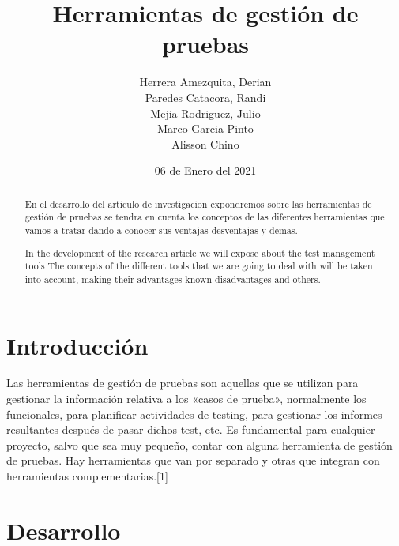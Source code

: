 \documentclass[twocolumn]{article}
\newenvironment{poliabstract}[1]
   {\renewcommand{\abstractname}{#1}\begin{abstract}}
   {\end{abstract}}
\begin{document}
\title{Herramientas de gestión de pruebas}
\author{Herrera Amezquita,
Derian  \\Paredes Catacora, Randi \\Mejia Rodriguez, Julio\\Marco Garcia Pinto\\Alisson Chino}


\date{06 de Enero del 2021}

\maketitle

\begin{poliabstract}{Resumen} 
  En el desarrollo del articulo de investigacion expondremos sobre las herramientas de gestión de pruebas 
  se tendra en cuenta los conceptos de las diferentes herramientas que vamos a tratar dando a conocer sus ventajas
   desventajas y demas.
  
\end{poliabstract}

\begin{poliabstract}{Abstract} 
  In the development of the research article we will expose about the test management tools
  The concepts of the different tools that we are going to deal with will be taken into account, 
  making their advantages known
  disadvantages and others.
\end{poliabstract}

\section{Introducción}
Las herramientas de gestión de pruebas son aquellas que se utilizan para gestionar la 
información relativa a los «casos de prueba», normalmente los funcionales, para planificar 
actividades de testing, para gestionar los informes resultantes después de pasar dichos test, 
etc.
Es fundamental para cualquier proyecto, salvo que sea muy pequeño, contar con alguna herramienta 
de gestión de pruebas. Hay herramientas que van por separado y otras que integran con 
herramientas complementarias.[1]


\section{Desarrollo}
\end{document}
